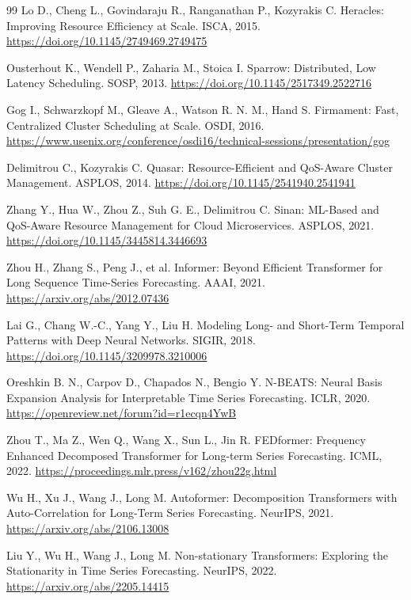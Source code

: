 \documentclass[UTF8]{ctexart}
\begin{document}
\begin{thebibliography}{99}
Lo D., Cheng L., Govindaraju R., Ranganathan P., Kozyrakis C. Heracles: Improving Resource Efficiency at Scale. ISCA, 2015. \url{https://doi.org/10.1145/2749469.2749475}

Ousterhout K., Wendell P., Zaharia M., Stoica I. Sparrow: Distributed, Low Latency Scheduling. SOSP, 2013. \url{https://doi.org/10.1145/2517349.2522716}

Gog I., Schwarzkopf M., Gleave A., Watson R. N. M., Hand S. Firmament: Fast, Centralized Cluster Scheduling at Scale. OSDI, 2016. \url{https://www.usenix.org/conference/osdi16/technical-sessions/presentation/gog}

Delimitrou C., Kozyrakis C. Quasar: Resource-Efficient and QoS-Aware Cluster Management. ASPLOS, 2014. \url{https://doi.org/10.1145/2541940.2541941}

Zhang Y., Hua W., Zhou Z., Suh G. E., Delimitrou C. Sinan: ML-Based and QoS-Aware Resource Management for Cloud Microservices. ASPLOS, 2021. \url{https://doi.org/10.1145/3445814.3446693}

Zhou H., Zhang S., Peng J., et al. Informer: Beyond Efficient Transformer for Long Sequence Time-Series Forecasting. AAAI, 2021. \url{https://arxiv.org/abs/2012.07436}

Lai G., Chang W.-C., Yang Y., Liu H. Modeling Long- and Short-Term Temporal Patterns with Deep Neural Networks. SIGIR, 2018. \url{https://doi.org/10.1145/3209978.3210006}

Oreshkin B. N., Carpov D., Chapados N., Bengio Y. N-BEATS: Neural Basis Expansion Analysis for Interpretable Time Series Forecasting. ICLR, 2020. \url{https://openreview.net/forum?id=r1ecqn4YwB}

Zhou T., Ma Z., Wen Q., Wang X., Sun L., Jin R. FEDformer: Frequency Enhanced Decomposed Transformer for Long-term Series Forecasting. ICML, 2022. \url{https://proceedings.mlr.press/v162/zhou22g.html}

Wu H., Xu J., Wang J., Long M. Autoformer: Decomposition Transformers with Auto-Correlation for Long-Term Series Forecasting. NeurIPS, 2021. \url{https://arxiv.org/abs/2106.13008}

Liu Y., Wu H., Wang J., Long M. Non-stationary Transformers: Exploring the Stationarity in Time Series Forecasting. NeurIPS, 2022. \url{https://arxiv.org/abs/2205.14415}


\end{thebibliography}
\end{document}
